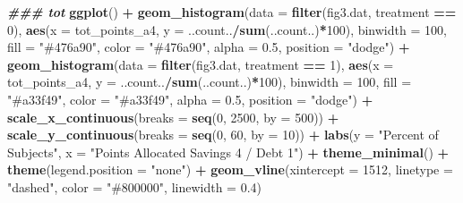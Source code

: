 \documentclass[
]{article}
\newenvironment{Shaded}{\begin{snugshade}}{\end{snugshade}}
\newcommand{\AttributeTok}[1]{\textcolor[rgb]{0.13,0.29,0.53}{#1}}
\newcommand{\DecValTok}[1]{\textcolor[rgb]{0.00,0.00,0.81}{#1}}
\newcommand{\DocumentationTok}[1]{\textcolor[rgb]{0.56,0.35,0.01}{\textbf{\textit{#1}}}}
\newcommand{\FloatTok}[1]{\textcolor[rgb]{0.00,0.00,0.81}{#1}}
\newcommand{\FunctionTok}[1]{\textcolor[rgb]{0.13,0.29,0.53}{\textbf{#1}}}
\newcommand{\NormalTok}[1]{#1}
\newcommand{\SpecialCharTok}[1]{\textcolor[rgb]{0.81,0.36,0.00}{\textbf{#1}}}
\newcommand{\StringTok}[1]{\textcolor[rgb]{0.31,0.60,0.02}{#1}}
\begin{document}
\begin{Shaded}
\begin{Highlighting}[]
\DocumentationTok{\#\#\# tot}
\FunctionTok{ggplot}\NormalTok{() }\SpecialCharTok{+}
  \FunctionTok{geom\_histogram}\NormalTok{(}\AttributeTok{data =} \FunctionTok{filter}\NormalTok{(fig3.dat, treatment }\SpecialCharTok{==} \DecValTok{0}\NormalTok{),}
                 \FunctionTok{aes}\NormalTok{(}\AttributeTok{x =}\NormalTok{ tot\_points\_a4, }\AttributeTok{y =}\NormalTok{ ..count..}\SpecialCharTok{/}\FunctionTok{sum}\NormalTok{(..count..)}\SpecialCharTok{*}\DecValTok{100}\NormalTok{),}
                 \AttributeTok{binwidth =} \DecValTok{100}\NormalTok{, }\AttributeTok{fill =} \StringTok{"\#476a90"}\NormalTok{, }\AttributeTok{color =} \StringTok{"\#476a90"}\NormalTok{, }\AttributeTok{alpha =} \FloatTok{0.5}\NormalTok{, }\AttributeTok{position =} \StringTok{"dodge"}\NormalTok{) }\SpecialCharTok{+}
  \FunctionTok{geom\_histogram}\NormalTok{(}\AttributeTok{data =} \FunctionTok{filter}\NormalTok{(fig3.dat, treatment }\SpecialCharTok{==} \DecValTok{1}\NormalTok{),}
                 \FunctionTok{aes}\NormalTok{(}\AttributeTok{x =}\NormalTok{ tot\_points\_a4, }\AttributeTok{y =}\NormalTok{ ..count..}\SpecialCharTok{/}\FunctionTok{sum}\NormalTok{(..count..)}\SpecialCharTok{*}\DecValTok{100}\NormalTok{),}
                 \AttributeTok{binwidth =} \DecValTok{100}\NormalTok{, }\AttributeTok{fill =} \StringTok{"\#a33f49"}\NormalTok{, }\AttributeTok{color =} \StringTok{"\#a33f49"}\NormalTok{, }\AttributeTok{alpha =} \FloatTok{0.5}\NormalTok{, }\AttributeTok{position =} \StringTok{"dodge"}\NormalTok{) }\SpecialCharTok{+}
  \FunctionTok{scale\_x\_continuous}\NormalTok{(}\AttributeTok{breaks =} \FunctionTok{seq}\NormalTok{(}\DecValTok{0}\NormalTok{, }\DecValTok{2500}\NormalTok{, }\AttributeTok{by =} \DecValTok{500}\NormalTok{)) }\SpecialCharTok{+}
  \FunctionTok{scale\_y\_continuous}\NormalTok{(}\AttributeTok{breaks =} \FunctionTok{seq}\NormalTok{(}\DecValTok{0}\NormalTok{, }\DecValTok{60}\NormalTok{, }\AttributeTok{by =} \DecValTok{10}\NormalTok{)) }\SpecialCharTok{+}
  \FunctionTok{labs}\NormalTok{(}\AttributeTok{y =} \StringTok{"Percent of Subjects"}\NormalTok{, }\AttributeTok{x =} \StringTok{"Points Allocated Savings 4 / Debt 1"}\NormalTok{) }\SpecialCharTok{+}
  \FunctionTok{theme\_minimal}\NormalTok{() }\SpecialCharTok{+}
  \FunctionTok{theme}\NormalTok{(}\AttributeTok{legend.position =} \StringTok{"none"}\NormalTok{) }\SpecialCharTok{+}
  \FunctionTok{geom\_vline}\NormalTok{(}\AttributeTok{xintercept =} \DecValTok{1512}\NormalTok{, }\AttributeTok{linetype =} \StringTok{"dashed"}\NormalTok{, }\AttributeTok{color =} \StringTok{"\#800000"}\NormalTok{, }\AttributeTok{linewidth =} \FloatTok{0.4}\NormalTok{)}
\end{Highlighting}
\end{Shaded}
\end{document}
